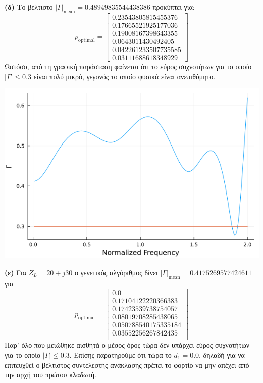 \documentclass[12pt]{article}
\begin{document}
\textbf{(δ)} 
Το βέλτιστο \(|\Gamma|_\text{mean} = 0.48949835544438386\) προκύπτει για: 
\[
    p_{\text{optimal}} = 
    \begin{bmatrix}
         0.23543805815455376 \\
 0.17665521925177036 \\
 0.19008167398643355 \\
 0.0643011430492405 \\
 0.042261233507735585 \\
 0.03111688618348929
    \end{bmatrix}
\] 
Ωστόσο, από τη γραφική παράσταση φαίνεται ότι το εύρος συχνοτήτων για το οποίο \(|\Gamma| \leq 0.3\) είναι πολύ μικρό, γεγονός το οποίο φυσικά είναι ανεπιθύμητο. 
\begin{center}
    \includegraphics[scale=0.5]{1-4-d.png}
\end{center}

\textbf{(ε)} Για \(Z_L = 20 + j30\) ο γενετικός αλγόριθμος δίνει \(|\Gamma|_\text{mean} = 0.4175269577424611\) για 
\[
    p_{\text{optimal}} = 
    \begin{bmatrix}
        0.0 \\
        0.17104122220366383 \\
        0.17423539738754057 \\
        0.08019708285438065 \\
        0.050788540175335184 \\
        0.03552256267842435 \\
    \end{bmatrix}
\] 
Παρ' όλο που μειώθηκε αισθητά ο μέσος όρος τώρα δεν υπάρχει εύρος συχνοτήτων για το οποίο \(|\Gamma| \leq 0.3\). 
Επίσης παρατηρούμε ότι τώρα το \(d_1 = 0.0\), δηλαδή για να επιτευχθεί ο βέλτιστος συντελεστής ανάκλασης πρέπει το φορτίο να μην απέχει από την αρχή του πρώτου κλαδωτή. 
\end{document}
